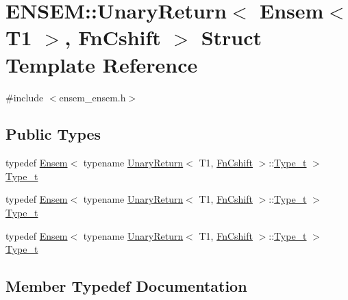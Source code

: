 \hypertarget{structENSEM_1_1UnaryReturn_3_01Ensem_3_01T1_01_4_00_01FnCshift_01_4}{}\section{E\+N\+S\+EM\+:\+:Unary\+Return$<$ Ensem$<$ T1 $>$, Fn\+Cshift $>$ Struct Template Reference}
\label{structENSEM_1_1UnaryReturn_3_01Ensem_3_01T1_01_4_00_01FnCshift_01_4}


{\ttfamily \#include $<$ensem\+\_\+ensem.\+h$>$}

\subsection*{Public Types}
\begin{DoxyCompactItemize}
\item 
typedef \mbox{\hyperlink{classENSEM_1_1Ensem}{Ensem}}$<$ typename \mbox{\hyperlink{structENSEM_1_1UnaryReturn}{Unary\+Return}}$<$ T1, \mbox{\hyperlink{structENSEM_1_1FnCshift}{Fn\+Cshift}} $>$\+::\mbox{\hyperlink{structENSEM_1_1UnaryReturn_3_01Ensem_3_01T1_01_4_00_01FnCshift_01_4_a1adec9b456e13e2aebde180312ff6235}{Type\+\_\+t}} $>$ \mbox{\hyperlink{structENSEM_1_1UnaryReturn_3_01Ensem_3_01T1_01_4_00_01FnCshift_01_4_a1adec9b456e13e2aebde180312ff6235}{Type\+\_\+t}}
\item 
typedef \mbox{\hyperlink{classENSEM_1_1Ensem}{Ensem}}$<$ typename \mbox{\hyperlink{structENSEM_1_1UnaryReturn}{Unary\+Return}}$<$ T1, \mbox{\hyperlink{structENSEM_1_1FnCshift}{Fn\+Cshift}} $>$\+::\mbox{\hyperlink{structENSEM_1_1UnaryReturn_3_01Ensem_3_01T1_01_4_00_01FnCshift_01_4_a1adec9b456e13e2aebde180312ff6235}{Type\+\_\+t}} $>$ \mbox{\hyperlink{structENSEM_1_1UnaryReturn_3_01Ensem_3_01T1_01_4_00_01FnCshift_01_4_a1adec9b456e13e2aebde180312ff6235}{Type\+\_\+t}}
\item 
typedef \mbox{\hyperlink{classENSEM_1_1Ensem}{Ensem}}$<$ typename \mbox{\hyperlink{structENSEM_1_1UnaryReturn}{Unary\+Return}}$<$ T1, \mbox{\hyperlink{structENSEM_1_1FnCshift}{Fn\+Cshift}} $>$\+::\mbox{\hyperlink{structENSEM_1_1UnaryReturn_3_01Ensem_3_01T1_01_4_00_01FnCshift_01_4_a1adec9b456e13e2aebde180312ff6235}{Type\+\_\+t}} $>$ \mbox{\hyperlink{structENSEM_1_1UnaryReturn_3_01Ensem_3_01T1_01_4_00_01FnCshift_01_4_a1adec9b456e13e2aebde180312ff6235}{Type\+\_\+t}}
\end{DoxyCompactItemize}


\subsection{Member Typedef Documentation}
\mbox{\label{structENSEM_1_1UnaryReturn_3_01Ensem_3_01T1_01_4_00_01FnCshift_01_4_a1adec9b456e13e2aebde180312ff6235}} 
